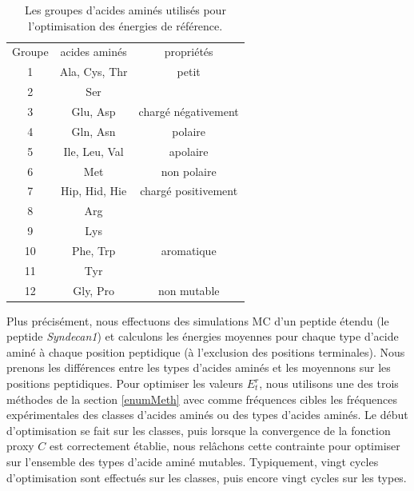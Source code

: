     \begin{table}[!htbp]
      \centering

      \begin{tabular}{ccc}

        \toprule
        Groupe & acides aminés & propriétés\\
        \cmidrule{1-3}

        1   & Ala, Cys, Thr & petit\\
        2   & Ser &\\
        \cmidrule{1-3}
        3   & Glu, Asp & chargé négativement\\
        \cmidrule{1-3}
        4   & Gln, Asn & polaire\\
        \cmidrule{1-3}
        5   & Ile, Leu, Val & apolaire\\
        \cmidrule{1-3}
        6   & Met & non polaire\\
        \cmidrule{1-3}
        7   & Hip, Hid, Hie & chargé positivement\\
        8   & Arg \\
        9   & Lys \\
        \cmidrule{1-3}
        10  & Phe, Trp & aromatique\\
        11  & Tyr \\
        \cmidrule{1-3}
        12  & Gly, Pro & non mutable\\
        \bottomrule


      \end{tabular}      
      \caption{Les groupes d'acides aminés utilisés pour l'optimisation des énergies de référence.}
\label{tab:AAgroups}      
    \end{table}
Plus précisément, nous effectuons des simulations MC d'un peptide étendu (le peptide \textit{Syndecan1}) et calculons les énergies moyennes pour chaque type d'acide aminé à chaque position peptidique (à l'exclusion des positions terminales). Nous prenons les différences entre les types d'acides aminés et les moyennons sur les positions peptidiques.
Pour optimiser les valeurs $E^r_t$, nous utilisons une des trois méthodes de la section \ref{enumMeth} avec comme fréquences cibles les fréquences expérimentales des classes d'acides aminés ou des types d'acides aminés. Le  début d'optimisation se fait sur les classes, puis lorsque la convergence de la fonction proxy $C$ est correctement établie, nous relâchons cette contrainte pour optimiser sur l'ensemble des types d'acide aminé mutables. Typiquement, vingt cycles d'optimisation sont effectués sur les classes, puis encore vingt cycles sur les types.  

